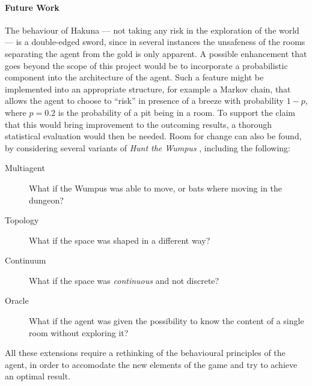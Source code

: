 \documentclass{llncs}
\newcommand{\htw}{\emph{Hunt the Wumpus }}
\begin{document}
\paragraph{Future Work} The behaviour of Hakuna --- not taking any risk in the exploration of the world --- is a double-edged sword, since in several instances the unsafeness of the rooms separating the agent from the gold is only apparent.
A possible enhancement that goes beyond the scope of this project would be to incorporate a probabilistic component into the architecture of the agent.
Such a feature might be implemented into an appropriate structure, for example a Markov chain, that allows the agent to choose to \enquote{risk} in presence of a breeze with probability $1 - p$, where $p = 0.2$ is the probability of a pit being in a room.
To support the claim that this would bring improvement to the outcoming results, a thorough statistical evaluation would then be needed.
Room for change can also be found, by considering several variants of \htw, including the following:
\begin{description}
	\item[Multiagent] What if the Wumpus was able to move, or bats where moving in the dungeon?
	\item[Topology] What if the space was shaped in a different way?
	\item[Continuum] What if the space was \emph{continuous} and not discrete?
	\item[Oracle] What if the agent was given the possibility to know the content of a single room without exploring it?
\end{description}
All these extensions require a rethinking of the behavioural principles of the agent, in order to accomodate the new elements of the game and try to achieve an optimal result.

\newpage
{}
\appendix
\footnotesize

\begin{multicols}{2}

\end{multicols}


\end{document}
